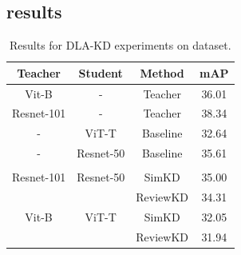 \subsection{\prima{} results}\label{sec:supp-prima}

\begin{table}[h]
\centering
\caption{Results for DLA-KD experiments on \prima{} dataset.}
\label{res:prima}
\begin{tabular}{@{}cccc@{}}
\toprule
\textbf{Teacher} & \textbf{Student} & \textbf{Method} & \textbf{mAP} \\ \midrule
Vit-B            & -                & Teacher        &         36.01     \\ %
Resnet-101       & -                & Teacher        & 38.34        \\
-                & ViT-T            & Baseline        &   32.64           \\ %
-                & Resnet-50        & Baseline        & 35.61        \\
                 &                  &                 &              \\
Resnet-101       & Resnet-50        & SimKD           & 35.00           \\
                 &                  & ReviewKD        & 34.31        \\
Vit-B            & ViT-T            & SimKD           &       32.05      \\ %
                 &                  & ReviewKD        &     31.94         \\ %
                 \bottomrule
\end{tabular}
\end{table}


